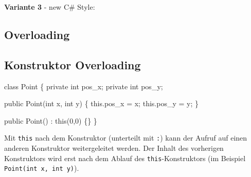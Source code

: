 \documentclass[
  10pt,
  a4paperpaper,
  DIV=11,
  numbers=noendperiod]{scrartcl}
\newenvironment{Shaded}{}{}
\newcommand{\DataTypeTok}[1]{\textcolor[rgb]{0.84,0.23,0.29}{#1}}
\newcommand{\DecValTok}[1]{\textcolor[rgb]{0.00,0.36,0.77}{#1}}
\newcommand{\FunctionTok}[1]{\textcolor[rgb]{0.44,0.26,0.76}{#1}}
\newcommand{\KeywordTok}[1]{\textcolor[rgb]{0.84,0.23,0.29}{#1}}
\newcommand{\NormalTok}[1]{\textcolor[rgb]{0.14,0.16,0.18}{#1}}
\newcommand{\OperatorTok}[1]{\textcolor[rgb]{0.14,0.16,0.18}{#1}}
\newcommand{\StringTok}[1]{\textcolor[rgb]{0.01,0.18,0.38}{#1}}
\begin{document}
\textbf{Variante 3} - new C\# Style:

\begin{Shaded}
\end{Shaded}

\begin{multicols}{2}

\hypertarget{overloading}{%
\section{Overloading}\label{overloading}}

\hypertarget{konstruktor-overloading}{%
\subsection{Konstruktor Overloading}\label{konstruktor-overloading}}

\begin{Shaded}
\begin{Highlighting}[]
\KeywordTok{class}\NormalTok{ Point }\OperatorTok{\{}
  \KeywordTok{private} \DataTypeTok{int}\NormalTok{ pos\_x}\OperatorTok{;}
  \KeywordTok{private} \DataTypeTok{int}\NormalTok{ pos\_y}\OperatorTok{;}

  \KeywordTok{public} \FunctionTok{Point}\OperatorTok{(}\DataTypeTok{int}\NormalTok{ x}\OperatorTok{,} \DataTypeTok{int}\NormalTok{ y}\OperatorTok{)} \OperatorTok{\{}
    \KeywordTok{this}\OperatorTok{.}\FunctionTok{pos\_x} \OperatorTok{=}\NormalTok{ x}\OperatorTok{;}
    \KeywordTok{this}\OperatorTok{.}\FunctionTok{pos\_y} \OperatorTok{=}\NormalTok{ y}\OperatorTok{;}
  \OperatorTok{\}}

  \KeywordTok{public} \FunctionTok{Point}\OperatorTok{()} \OperatorTok{:} \KeywordTok{this}\OperatorTok{(}\DecValTok{0}\OperatorTok{,}\DecValTok{0}\OperatorTok{)} \OperatorTok{\{\}}
\OperatorTok{\}}
\end{Highlighting}
\end{Shaded}

Mit \texttt{this} nach dem Konstruktor (unterteilt mit \texttt{:}) kann
der Aufruf auf einen anderen Konstruktor weitergeleitet werden. Der
Inhalt des vorherigen Konstruktors wird erst nach dem Ablauf des
\texttt{this}-Konstruktors (im Beispiel
\texttt{Point(int\ x,\ int\ y)}).


\end{multicols}
\end{document}
